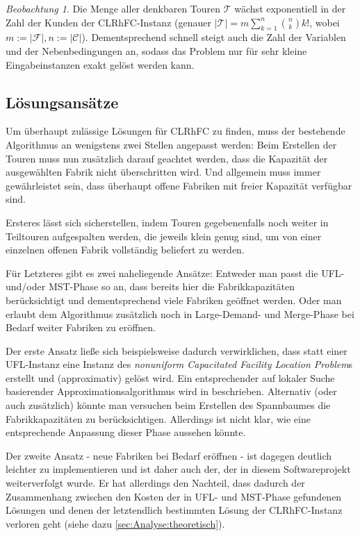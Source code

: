 \documentclass[a4paper,ngerman,11pt,bibtotoc]{scrartcl}
\theoremstyle{definition}
\theoremstyle{plain}
\theoremstyle{remark}
\newtheorem{beob}[defn]{Beobachtung}
\newcommand{\ClientSet}{\mathscr{C}}
\newcommand{\FacilitySet}{\mathscr{F}}
\newcommand{\allTours}{\mathscr{T}}
\newcommand{\CLRHFC}{CLRhFC}
\newcommand{\MST}{MST}
\newcommand{\UFL}{UFL}
\begin{document}
\begin{beob}
	Die Menge aller denkbaren Touren $\allTours$ wächst exponentiell in der Zahl der Kunden der \CLRHFC-Instanz (genauer $|\allTours| = m \sum_{k=1}^{n} {n \choose k}k!$, wobei $m := |\FacilitySet|, n := |\ClientSet|$). Dementsprechend schnell steigt auch die Zahl der Variablen und der Nebenbedingungen an, sodass das Problem nur für sehr kleine Eingabeinstanzen exakt gelöst werden kann.
\end{beob}


	\subsection{Lösungsansätze}
	
	Um überhaupt zulässige Lösungen für \CLRHFC{} zu finden, muss der bestehende Algorithmus an wenigstens zwei Stellen angepasst werden: Beim Erstellen der Touren muss nun zusätzlich darauf geachtet werden, dass die Kapazität der ausgewählten Fabrik nicht überschritten wird. Und allgemein muss immer gewährleistet sein, dass überhaupt offene Fabriken mit freier Kapazität verfügbar sind.
	
	Ersteres lässt sich sicherstellen, indem Touren gegebenenfalls noch weiter in Teiltouren aufgespalten werden, die jeweils klein genug sind, um von einer einzelnen offenen Fabrik vollständig beliefert zu werden.
	
	Für Letzteres gibt es zwei naheliegende Ansätze: Entweder man passt die \UFL- und/oder \MST-Phase so an, dass bereits hier die Fabrikkapazitäten berücksichtigt und dementsprechend viele Fabriken geöffnet werden. Oder man erlaubt dem Algorithmus zusätzlich noch in Large-Demand- und Merge-Phase bei Bedarf weiter Fabriken zu eröffnen. 
	
	Der erste Ansatz ließe sich beispielsweise dadurch verwirklichen, dass statt einer \UFL-Instanz eine Instanz des \emph{nonuniform Capacitated Facility Location Problem}s erstellt und (approximativ) gelöst wird. Ein entsprechender auf lokaler Suche basierender Approximationsalgorithmus wird in \cite{Pal01facilitylocation} beschrieben. Alternativ (oder auch zusätzlich) könnte man versuchen beim Erstellen des Spannbaumes die Fabrikkapazitäten zu berücksichtigen. Allerdings ist nicht klar, wie eine entsprechende Anpassung dieser Phase aussehen könnte.
	
	Der zweite Ansatz - neue Fabriken bei Bedarf eröffnen - ist dagegen deutlich leichter zu implementieren und ist daher auch der, der in diesem Softwareprojekt weiterverfolgt wurde. Er hat allerdings den Nachteil, dass dadurch der Zusammenhang zwischen den Kosten der in \UFL- und \MST-Phase gefundenen Lösungen und denen der letztendlich bestimmten Lösung der \CLRHFC-Instanz verloren geht (siehe dazu \cref{sec:Analyse:theoretisch}).
\end{document}
